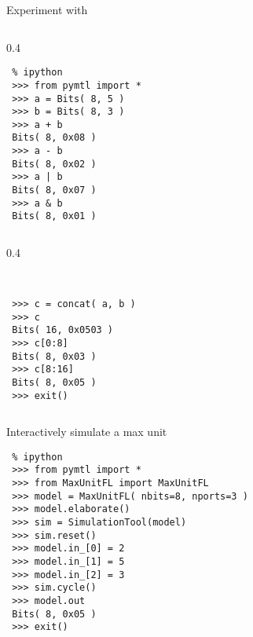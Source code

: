 \begin{task}\begin{frame}[fragile]{Experiment with }

\vspace{-0.15in}
\begin{cbxcols}

\begin{column}{0.4\tw}
\begin{lstlisting}[xleftmargin={0in},numbers={none},basicstyle={\ttfamily\small}]
 % cd
 % ipython
 >>> from pymtl import *
 >>> a = Bits( 8, 5 )
 >>> b = Bits( 8, 3 )
 >>> a + b
 Bits( 8, 0x08 )
 >>> a - b
 Bits( 8, 0x02 )
 >>> a | b
 Bits( 8, 0x07 )
 >>> a & b
 Bits( 8, 0x01 )
\end{lstlisting}
\end{column}

\begin{column}{0.4\tw}
\begin{lstlisting}[xleftmargin={0in},numbers={none},basicstyle={\ttfamily\small}]


 >>> c = concat( a, b )
 >>> c
 Bits( 16, 0x0503 )
 >>> c[0:8]
 Bits( 8, 0x03 )
 >>> c[8:16]
 Bits( 8, 0x05 )
 >>> exit()
\end{lstlisting}
\end{column}

\end{cbxcols}
\end{frame}
\end{task}

\begin{task}\begin{frame}[fragile]{Interactively simulate a max unit}

\vspace{-0.15in}
\begin{lstlisting}[xleftmargin={0in},numbers={none},basicstyle={\ttfamily\small}]
 % cd ~/pymtl-tut/maxunit
 % ipython
 >>> from pymtl import *
 >>> from MaxUnitFL import MaxUnitFL
 >>> model = MaxUnitFL( nbits=8, nports=3 )
 >>> model.elaborate()
 >>> sim = SimulationTool(model)
 >>> sim.reset()
 >>> model.in_[0] = 2
 >>> model.in_[1] = 5
 >>> model.in_[2] = 3
 >>> sim.cycle()
 >>> model.out
 Bits( 8, 0x05 )
 >>> exit()
\end{lstlisting}

\end{frame}
\end{task}

